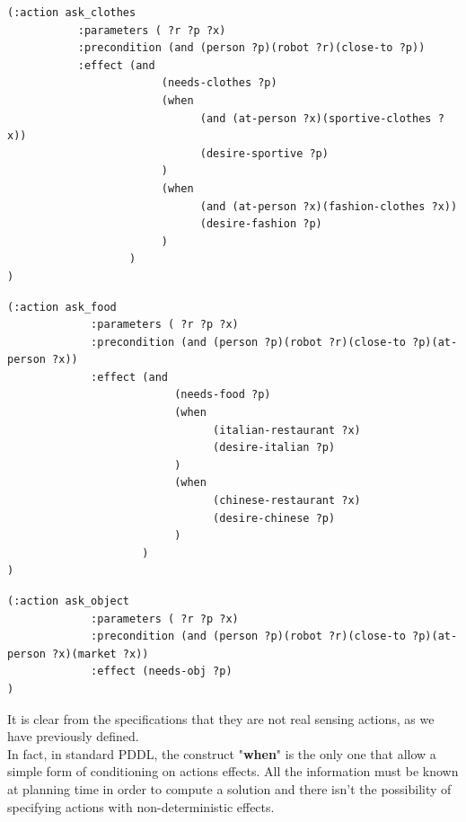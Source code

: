 \documentclass[pdftex,12pt,a4paper]{report}
\begin{document}
\begin{verbatim}
(:action ask_clothes
           :parameters ( ?r ?p ?x)
           :precondition (and (person ?p)(robot ?r)(close-to ?p))
           :effect (and
                        (needs-clothes ?p)
                        (when
                              (and (at-person ?x)(sportive-clothes ?x))
                              (desire-sportive ?p)
                        )
                        (when
                              (and (at-person ?x)(fashion-clothes ?x))
                              (desire-fashion ?p)
                        )
                   )
)
\end{verbatim}

\begin{verbatim}
(:action ask_food
             :parameters ( ?r ?p ?x)
             :precondition (and (person ?p)(robot ?r)(close-to ?p)(at-person ?x))
             :effect (and
                          (needs-food ?p)
                          (when
                                (italian-restaurant ?x)
                                (desire-italian ?p)
                          )
                          (when
                                (chinese-restaurant ?x)
                                (desire-chinese ?p)
                          )
                     )
)
\end{verbatim}

\begin{verbatim}
(:action ask_object 
             :parameters ( ?r ?p ?x)
             :precondition (and (person ?p)(robot ?r)(close-to ?p)(at-person ?x)(market ?x))
             :effect (needs-obj ?p)
)
\end{verbatim}

\noindent It is clear from the specifications that they are not real sensing actions, as we have previously defined.\\ 
In fact, in standard PDDL, the construct "\textbf{when}" is the only one that allow a simple form of conditioning on actions effects. 
All the information must be known at planning time in order to compute a solution and there isn't the possibility of specifying actions with non-deterministic effects.
\end{document}
